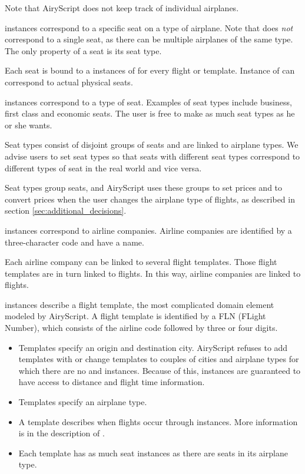 \begin{description}
    Note that AiryScript does not keep track of individual airplanes.

  \item[\dbf{Seat}] instances correspond to a specific seat on a type of airplane. Note
    that  does \emph{not} correspond to a single seat, as there can be
    multiple airplanes of the same type. The only property of a seat is its seat
    type.

    Each seat is bound to a instances of  for every flight or
    template. Instance of  can correspond to actual physical
    seats.

  \item[\dbf{SeatType}] instances correspond to a type of seat. Examples of seat
    types include business, first class and economic seats. The user is free to
    make as much seat types as he or she wants.

    Seat types consist of disjoint groups of seats and are linked to airplane
    types. We advise users to set seat types so that seats with different seat
    types correspond to different types of seat in the real world and vice
    versa.
    
    Seat types group seats, and AiryScript uses these groups to set prices and
    to convert prices when the user changes the airplane type of flights, as
    described in section \ref{sec:additional_decisions}.

  \item[\dbf{AirlineCompany}] instances correspond to airline companies. Airline
    companies are identified by a three-character code and have a name.

    Each airline company can be linked to several flight templates. Those flight
    templates are in turn linked to flights. In this way, airline companies are
    linked to flights.

  \item[\dbf{Template}] instances describe a flight template, the most
    complicated domain element modeled by AiryScript. A flight template is
    identified by a FLN (FLight Number), which consists of the airline code
    followed by three or four digits.
    
    \begin{itemize}
      \item Templates specify an origin and destination city.  AiryScript
        refuses to add templates with or change templates to couples of cities
        and airplane types for which there are no  and
         instances.  Because of this,  instances
        are guaranteed to have access to distance and flight time information.
      \item Templates specify an airplane type.
      \item A template describes when flights occur through 
        instances. More information is in the description of .
      \item Each template has as much seat instances as there are seats in its
        airplane type.
    \end{itemize}


\end{description}
